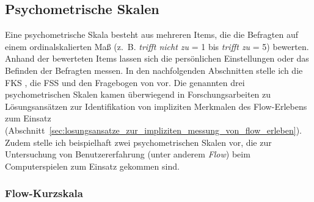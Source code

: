 \subsection{Psychometrische Skalen} 

\label{sub:psychometrische_skalen}

Eine psychometrische Skala besteht aus mehreren Items, die die Befragten auf einem ordinalskalierten Maß (z.~B. \emph{trifft nicht zu} = 1 bis \emph{trifft zu} = 5) bewerten. Anhand der bewerteten Items lassen sich die persönlichen Einstellungen oder das Befinden der Befragten messen. In den nachfolgenden Abschnitten stelle ich die \ac{FKS} \citep{Rheinberg2003}, die \ac{FSS} \citep{Jackson1996} und den Fragebogen von \citet{Keller2008} vor. Die genannten drei psychometrischen Skalen kamen überwiegend in Forschungsarbeiten zu Lösungsansätzen zur Identifikation von impliziten Merkmalen des Flow-Erlebens zum Einsatz (Abschnitt~\ref{sec:losungsansatze_zur_impliziten_messung_von_flow_erleben}). Zudem stelle ich beispielhaft zwei psychometrischen Skalen vor, die zur Untersuchung von Benutzererfahrung (unter anderem \emph{Flow}) beim Computerspielen zum Einsatz gekommen sind. 

\subsubsection{Flow-Kurzskala} 

\label{ssub:flow_kurzskala}

